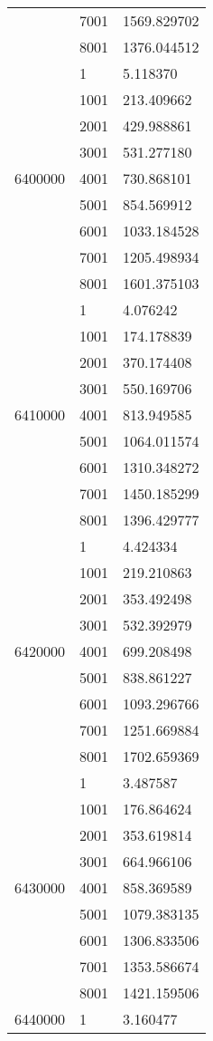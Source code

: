 \begin{table}[htb!]
\begin{tabular}{lll}
 & 7001 & 1569.829702 \\
 & 8001 & 1376.044512 \\
\multirow[c]{9}{*}{6400000} & 1 & 5.118370 \\
 & 1001 & 213.409662 \\
 & 2001 & 429.988861 \\
 & 3001 & 531.277180 \\
 & 4001 & 730.868101 \\
 & 5001 & 854.569912 \\
 & 6001 & 1033.184528 \\
 & 7001 & 1205.498934 \\
 & 8001 & 1601.375103 \\
\multirow[c]{9}{*}{6410000} & 1 & 4.076242 \\
 & 1001 & 174.178839 \\
 & 2001 & 370.174408 \\
 & 3001 & 550.169706 \\
 & 4001 & 813.949585 \\
 & 5001 & 1064.011574 \\
 & 6001 & 1310.348272 \\
 & 7001 & 1450.185299 \\
 & 8001 & 1396.429777 \\
\multirow[c]{9}{*}{6420000} & 1 & 4.424334 \\
 & 1001 & 219.210863 \\
 & 2001 & 353.492498 \\
 & 3001 & 532.392979 \\
 & 4001 & 699.208498 \\
 & 5001 & 838.861227 \\
 & 6001 & 1093.296766 \\
 & 7001 & 1251.669884 \\
 & 8001 & 1702.659369 \\
\multirow[c]{9}{*}{6430000} & 1 & 3.487587 \\
 & 1001 & 176.864624 \\
 & 2001 & 353.619814 \\
 & 3001 & 664.966106 \\
 & 4001 & 858.369589 \\
 & 5001 & 1079.383135 \\
 & 6001 & 1306.833506 \\
 & 7001 & 1353.586674 \\
 & 8001 & 1421.159506 \\
\multirow[c]{9}{*}{6440000} & 1 & 3.160477 \\

\end{tabular}
\end{table}
